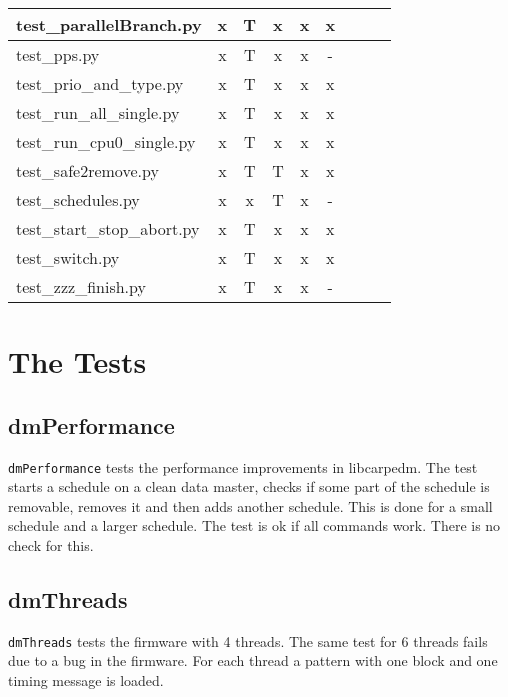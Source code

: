 \documentclass[12pt,a4paper]{report}
\begin{document}
\begin{table}
\begin{tabular}[t]{|l|c|c|c|c|c|c|c|c|}
test\_parallelBranch.py     &   x        &   T             &   x           &   x              &   x                \\ \hline
test\_pps.py                &   x        &   T             &   x           &   x              &   -                \\ \hline
test\_prio\_and\_type.py    &   x        &   T             &   x           &   x              &   x                \\ \hline
test\_run\_all\_single.py   &   x        &   T             &   x           &   x              &   x                \\ \hline
test\_run\_cpu0\_single.py  &   x        &   T             &   x           &   x              &   x                \\ \hline
test\_safe2remove.py        &   x        &   T             &   T           &   x              &   x                \\ \hline
test\_schedules.py          &   x        &   x             &   T           &   x              &   -                \\ \hline
test\_start\_stop\_abort.py &   x        &   T             &   x           &   x              &   x                \\ \hline
test\_switch.py             &   x        &   T             &   x           &   x              &   x                \\ \hline
test\_zzz\_finish.py        &   x        &   T             &   x           &   x              &   -                \\ \hline
\end{tabular}
\end{table}
\chapter{The Tests}
\section{dmPerformance}
\texttt{dmPerformance} tests the performance improvements in libcarpedm.
The test starts a schedule on a clean data master, checks if some part of the schedule is removable, removes it and
then adds another schedule. This is done for a small schedule and a larger schedule. The test is ok if all commands
work. There is no check for this.
\section{dmThreads}
\texttt{dmThreads} tests the firmware with 4 threads. The same test for 6 threads fails due to a bug in the
firmware. For each thread a pattern with one block and one timing message is loaded.

\end{document}
